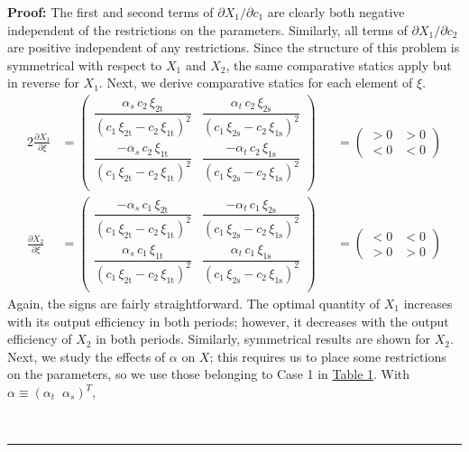 \documentclass[12pt,a4paper]{extarticle}
\newenvironment{proof}[1][Proof]{\noindent\textbf{#1:} }{\ \rule{0.5em}{0.5em}}
\begin{document}
\begin{proof}
The first and second terms of $\partial X_1 / \partial c_1$ are clearly both negative independent of the restrictions on the parameters. Similarly, all terms of  $\partial X_1 / \partial c_2$ are positive independent of any restrictions. Since the structure of this problem is symmetrical with respect to $X_1$ and $X_2$, the same comparative statics apply but in reverse for $X_1$. Next, we derive comparative statics for each element of $\xi$.
\begin{alignat*}{2}
\frac{\partial X_1}{\partial \xi} &= 
\begin{pmatrix}
\dfrac{\alpha _{s}\,c_{2}\,\xi _{\mathrm{2t}}}{{\left(c_{1}\,\xi _{\mathrm{2t}}-c_{2}\,\xi _{\mathrm{1t}}\right)}^2} & \dfrac{\alpha _{t}\,c_{2}\,\xi _{\mathrm{2s}}}{{\left(c_{1}\,\xi _{\mathrm{2s}}-c_{2}\,\xi _{\mathrm{1s}}\right)}^2} \\
\dfrac{-\alpha _{s}\,c_{2}\,\xi _{\mathrm{1t}}}{{\left(c_{1}\,\xi _{\mathrm{2t}}-c_{2}\,\xi _{\mathrm{1t}}\right)}^2} & \dfrac{-\alpha _{t}\,c_{2}\,\xi _{\mathrm{1s}}}{{\left(c_{1}\,\xi _{\mathrm{2s}}-c_{2}\,\xi _{\mathrm{1s}}\right)}^2} \\
\end{pmatrix}
&&=
\begin{pmatrix}
> 0 & > 0  \\
< 0 & < 0
\end{pmatrix} \\
\frac{\partial X_2}{\partial \xi} &= 
\begin{pmatrix}
\dfrac{-\alpha _{s}\,c_{1}\,\xi _{\mathrm{2t}}}{{\left(c_{1}\,\xi _{\mathrm{2t}}-c_{2}\,\xi _{\mathrm{1t}}\right)}^2} & \dfrac{-\alpha _{t}\,c_{1}\,\xi _{\mathrm{2s}}}{{\left(c_{1}\,\xi _{\mathrm{2s}}-c_{2}\,\xi _{\mathrm{1s}}\right)}^2} \\
\dfrac{\alpha _{s}\,c_{1}\,\xi _{\mathrm{1t}}}{{\left(c_{1}\,\xi _{\mathrm{2t}}-c_{2}\,\xi _{\mathrm{1t}}\right)}^2}& \dfrac{\alpha _{t}\,c_{1}\,\xi _{\mathrm{1s}}}{{\left(c_{1}\,\xi _{\mathrm{2s}}-c_{2}\,\xi _{\mathrm{1s}}\right)}^2} \\
\end{pmatrix}
&&=
\begin{pmatrix}
< 0 & < 0 \\
> 0 & > 0  
\end{pmatrix}
\end{alignat*}
Again, the signs are fairly straightforward. The optimal quantity of $X_1$ increases with its output efficiency in both periods; however, it decreases with the output efficiency of $X_2$ in both periods. Similarly, symmetrical results are shown for $X_2$. Next, we study the effects of $\alpha$ on $X$; this requires us to place some restrictions on the parameters, so we use those belonging to Case 1 in \hyperref[tab:paramrest]{Table 1}. With $\alpha \equiv \left( \alpha_t \;\; \alpha_s \right)^T$, 

\end{proof}
\end{document}

